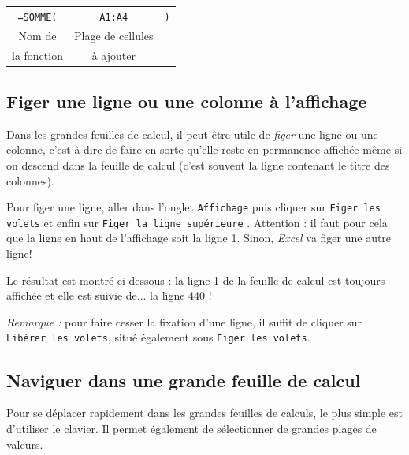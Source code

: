 \begin{center}
	\begin{tabular}{ccc}
		\texttt{=SOMME(} & \texttt{A1:A4} &   \texttt{)} \\  
		Nom de & Plage de cellules  & \\
		la fonction & à ajouter & \\  
	\end{tabular}
\end{center}


\subsection{Figer une ligne ou une colonne à l'affichage}\label{Calc3fixer} 

Dans les grandes feuilles de calcul, il peut être utile de \emph{figer} une ligne ou une colonne, c'est-à-dire de faire en sorte qu'elle reste en permanence affichée même si on descend dans la feuille de calcul (c'est souvent la ligne contenant le titre des colonnes).


Pour figer une ligne, aller dans l'onglet \texttt{Affichage}  puis cliquer sur \texttt{Figer les volets}  et enfin sur \texttt{Figer la ligne supérieure} . Attention : il faut pour cela que la ligne en haut de l'affichage soit la ligne 1. Sinon, \emph{Excel} va figer une autre ligne!


Le résultat est montré ci-dessous : la ligne 1 de la feuille de calcul est toujours affichée et elle est suivie de... la ligne 440 !


\emph{Remarque :} pour faire cesser la fixation d'une ligne, il suffit de cliquer sur \texttt{Libérer les volets}, situé également sous \texttt{Figer les volets}.


\subsection{Naviguer dans une grande feuille de calcul}\label{Calc3navigue} 
Pour se déplacer rapidement dans les grandes feuilles de calculs, le plus simple est d'utiliser le clavier. Il permet également de sélectionner de grandes plages de valeurs.

